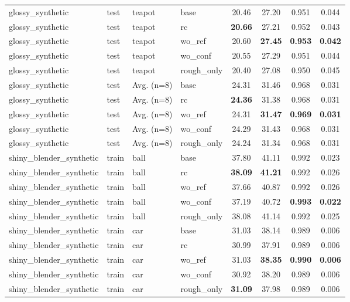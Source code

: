 \begin{table}[t]
{\begin{tabular}{llllcccc}
glossy\_synthetic & test & teapot & base & 20.46 & 27.20 & 0.951 & 0.044 \\
glossy\_synthetic & test & teapot & rc & \textbf{20.66} & 27.21 & 0.952 & 0.043 \\
glossy\_synthetic & test & teapot & wo\_ref & 20.60 & \textbf{27.45} & \textbf{0.953} & \textbf{0.042} \\
glossy\_synthetic & test & teapot & wo\_conf & 20.55 & 27.29 & 0.951 & 0.044 \\
glossy\_synthetic & test & teapot & rough\_only & 20.40 & 27.08 & 0.950 & 0.045 \\
glossy\_synthetic & test & Avg. (n=8) & base & 24.31 & 31.46 & 0.968 & 0.031 \\
glossy\_synthetic & test & Avg. (n=8) & rc & \textbf{24.36} & 31.38 & 0.968 & 0.031 \\
glossy\_synthetic & test & Avg. (n=8) & wo\_ref & 24.31 & \textbf{31.47} & \textbf{0.969} & \textbf{0.031} \\
glossy\_synthetic & test & Avg. (n=8) & wo\_conf & 24.29 & 31.43 & 0.968 & 0.031 \\
glossy\_synthetic & test & Avg. (n=8) & rough\_only & 24.24 & 31.34 & 0.968 & 0.031 \\
\midrule
shiny\_blender\_synthetic & train & ball & base & 37.80 & 41.11 & 0.992 & 0.023 \\
shiny\_blender\_synthetic & train & ball & rc & \textbf{38.09} & \textbf{41.21} & 0.992 & 0.026 \\
shiny\_blender\_synthetic & train & ball & wo\_ref & 37.66 & 40.87 & 0.992 & 0.026 \\
shiny\_blender\_synthetic & train & ball & wo\_conf & 37.19 & 40.72 & \textbf{0.993} & \textbf{0.022} \\
shiny\_blender\_synthetic & train & ball & rough\_only & 38.08 & 41.14 & 0.992 & 0.025 \\
shiny\_blender\_synthetic & train & car & base & 31.03 & 38.14 & 0.989 & 0.006 \\
shiny\_blender\_synthetic & train & car & rc & 30.99 & 37.91 & 0.989 & 0.006 \\
shiny\_blender\_synthetic & train & car & wo\_ref & 31.03 & \textbf{38.35} & \textbf{0.990} & \textbf{0.006} \\
shiny\_blender\_synthetic & train & car & wo\_conf & 30.92 & 38.20 & 0.989 & 0.006 \\
shiny\_blender\_synthetic & train & car & rough\_only & \textbf{31.09} & 37.98 & 0.989 & 0.006 \\

\end{tabular}}
\end{table}
